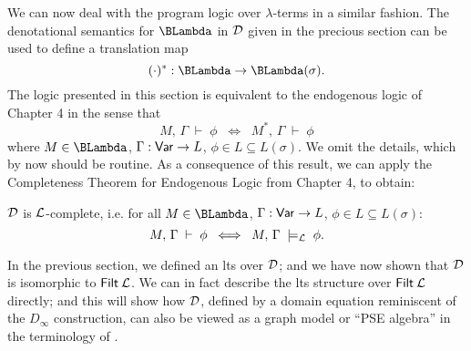 We can now deal with the program logic over $\lambda$-terms in a similar fashion. The denotational semantics for $\BLambda$ in $\cal D$ given in the precious section can be used to define a translation map
\[ ( \cdot )^{\ast} : \BLambda \rightarrow \BLambda (\sigma ) . \]
The logic presented in this section is equivalent to the endogenous logic of Chapter 4 in the sense that
\[ M,\, \Gamma \; \vdash \; \phi \;\; \Longleftrightarrow \;\; M^{\ast}, \, \Gamma \; \vdash \; \phi \]
where $M \in \BLambda$, $\Gamma : {\sf Var} \rightarrow L$, $\phi \in L \subseteq L(\sigma )$. We omit the details, which by now should be routine. As a consequence of this result, we can apply the Completeness Theorem for Endogenous Logic from Chapter 4, to obtain:
\begin{theorem}
$\cal D$ is $\cal L$-complete, i.e. for all $M \in \BLambda$, $\Gamma : {\sf Var} \rightarrow L$, $\phi \in L \subseteq L(\sigma )$:
\[ M, \, \Gamma \; \vdash \; \phi \;\; \Longleftrightarrow \;\; M, \, \Gamma \; \models_{\cal L} \; \phi . \]
\end{theorem}

In the previous section, we defined an lts over $\cal D$; 
and we have now shown that $\cal D$ is isomorphic to ${\sf Filt} \: {\cal L}$. 
We can in fact describe the lts structure over ${\sf Filt} \: {\cal L}$ directly; 
and this will show how $\cal D$, defined by a domain equation reminiscent of 
the $D_{\infty}$ construction, can also be viewed as a graph model or 
``PSE algebra'' in the terminology of \cite{Lon83}.

